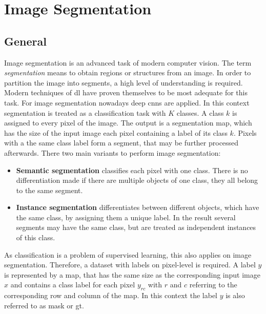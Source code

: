 
\section{Image Segmentation}\label{ord:ch2:sec2}

\subsection{General}\label{ord:ch2:sec2:subsec1}
Image segmentation is an advanced task of modern computer vision.
The term \emph{segmentation} means to obtain regions or structures from an image.
In order to partition the image into segments, a high level of understanding is required.
Modern techniques of \gls{dl} have proven themselves to be most adequate for this task.
For image segmentation nowadays deep \glspl{cnn} are applied.
In this context segmentation is treated as a classification task with $K$ classes.
A class $k$ is assigned to every pixel of the image.
The output is a segmentation map, which has the size of the input image each pixel containing a label of its class $k$. 
Pixels with a the same class label form a segment, that may be further processed afterwards.
There two main variants to perform image segmentation:
\begin{itemize}
	\item \textbf{Semantic segmentation} classifies each pixel with one class.
	There is no differentiation made if there are multiple objects of one class, they all belong to the same segment.
	\item \textbf{Instance segmentation} differentiates between different objects, which have the same class, by assigning them a unique label.
	In the result several segments may have the same class, but are treated as independent instances of this class.
\end{itemize}

As classification is a problem of supervised learning, this also applies on image segmentation.
Therefore, a dataset with labels on pixel-level is required.
A label $y$ is represented by a map, that has the same size as the corresponding input image $x$ and contains a class label for each pixel $y_{rc}$ with $r$ and $c$ referring to the corresponding row and column of the map. 
In this context the label $y$ is also referred to as mask or \gls{gt}.

